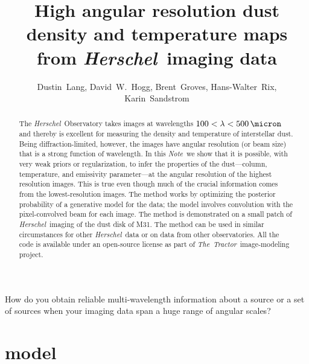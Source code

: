 \documentclass[12pt,pdftex,preprint]{aastex}
\newcommand{\documentname}{\textsl{Note}}
\newcommand{\project}[1]{\textsl{#1}}
\newcommand{\TheTractor}{\project{The~Tractor}}
\newcommand{\Herschel}{\project{Herschel}}
\begin{document}
\title{High angular resolution dust density and temperature maps from \Herschel\ imaging data}
\author{
  Dustin~Lang,
  David~W.~Hogg,
  Brent~Groves,
  Hans-Walter~Rix,
  Karin~Sandstrom}

\begin{abstract}
The \Herschel\ Observatory takes images at wavelengths
$100<\lambda<500\,\micron$ and thereby is excellent for measuring the
density and temperature of interstellar dust.  Being
diffraction-limited, however, the images have angular resolution (or
beam size) that is a strong function of wavelength.  In this
\documentname\ we show that it is possible, with very weak priors or
regularization, to infer the properties of the dust---column,
temperature, and emissivity parameter---at the angular resolution of
the highest resolution images.  This is true even though much of the
crucial information comes from the lowest-resolution images.  The
method works by optimizing the posterior probability of a generative
model for the data; the model involves convolution with the
pixel-convolved beam for each image.  The method is demonstrated on a
small patch of \Herschel\ imaging of the dust disk of M31.  The method
can be used in similar circumstances for other \Herschel\ data or on
data from other observatories.  All the code is available under an
open-source license as part of \TheTractor\ image-modeling project.
\end{abstract}

How do you obtain reliable multi-wavelength information about a source
or a set of sources when your imaging data span a huge range of
angular scales?

\section{model}
\end{document}
